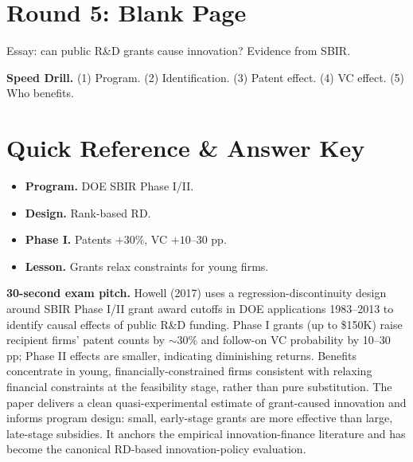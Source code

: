 \documentclass[11pt]{article}
\begin{document}
\section*{Round 5: Blank Page}
Essay: can public R\&D grants cause innovation? Evidence from SBIR.

\vspace{6pt}
\begin{drillbox}
\textbf{Speed Drill.} (1) Program. (2) Identification. (3) Patent effect. (4) VC effect. (5) Who benefits.
\end{drillbox}

\section*{Quick Reference \& Answer Key}
\begin{answerbox}
\begin{itemize}
\item \textbf{Program.} DOE SBIR Phase I/II.
\item \textbf{Design.} Rank-based RD.
\item \textbf{Phase I.} Patents $+30\%$, VC $+10$--$30$ pp.
\item \textbf{Lesson.} Grants relax constraints for young firms.
\end{itemize}
\end{answerbox}

\begin{keybox}
\textbf{30-second exam pitch.} Howell (2017) uses a regression-discontinuity design around SBIR Phase I/II grant award cutoffs in DOE applications 1983--2013 to identify causal effects of public R\&D funding. Phase I grants (up to \$150K) raise recipient firms' patent counts by $\sim$30\% and follow-on VC probability by 10--30 pp; Phase II effects are smaller, indicating diminishing returns. Benefits concentrate in young, financially-constrained firms consistent with relaxing financial constraints at the feasibility stage, rather than pure substitution. The paper delivers a clean quasi-experimental estimate of grant-caused innovation and informs program design: small, early-stage grants are more effective than large, late-stage subsidies. It anchors the empirical innovation-finance literature and has become the canonical RD-based innovation-policy evaluation.
\end{keybox}
\end{document}
